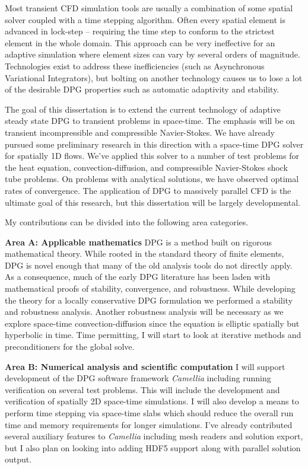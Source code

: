 \documentclass[letterpaper]{article}
\begin{document}
Most transient CFD simulation tools are usually a combination of some spatial solver coupled with a time stepping algorithm.
Often every spatial element is advanced in lock-step -- requiring the time step to conform to the strictest element in the whole domain.
This approach can be very ineffective for an adaptive simulation where element sizes can vary by several orders of magnitude.
Technologies exist to address these inefficiencies (such as Asynchronous Variational Integrators\cite{Lew2003}), but bolting on another technology
causes us to lose a lot of the desirable DPG properties such as automatic adaptivity and stability.

The goal of this dissertation is to extend the current technology of adaptive steady state DPG to transient problems in space-time.
The emphasis will be on transient incompressible and compressible Navier-Stokes.
We have already pursued some preliminary research in this direction with a space-time DPG solver for spatially 1D flows.
We've applied this solver to a number of test problems for the heat equation, convection-diffusion, and compressible Navier-Stokes shock tube problems.
On problems with analytical solutions, we have observed optimal rates of convergence.
The application of DPG to massively parallel CFD is the ultimate goal of this research, but this dissertation will be largely developmental.

My contributions can be divided into the following area categories.


\textbf{Area A: Applicable mathematics}
DPG is a method built on rigorous mathematical theory.
While rooted in the standard theory of finite elements, DPG is novel enough that many of the old analysis tools do not directly apply.
As a consequence, much of the early DPG literature has been laden with mathematical proofs of stability, convergence, and robustness.
While developing the theory for a locally conservative DPG formulation we performed a stability and robustness analysis.
Another robustness analysis will be necessary as we explore space-time convection-diffusion since the equation is elliptic spatially but hyperbolic in time.
Time permitting, I will start to look at iterative methods and preconditioners for the global solve.

\textbf{Area B: Numerical analysis and scientific computation}
I will support development of the DPG software framework \emph{Camellia}\cite{Roberts2011} including running verification on several test problems.
This will include the development and verification of spatially 2D space-time simulations.
I will also develop a means to perform time stepping via space-time slabs which should reduce the 
overall run time and memory requirements for longer simulations.
I've already contributed several auxiliary features to \emph{Camellia} including mesh readers and solution export, 
but I also plan on looking into adding HDF5 support along with parallel solution output.
\end{document}
